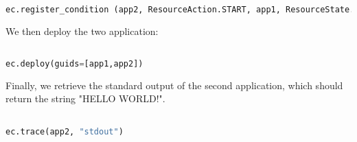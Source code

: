 \begin{lstlisting}[language=Python]

ec.register_condition (app2, ResourceAction.START, app1, ResourceState.STOPPED)

\end{lstlisting}

We then deploy the two application:

\begin{lstlisting}[language=Python]

ec.deploy(guids=[app1,app2])

\end{lstlisting}

Finally, we retrieve the standard output of the second application, 
which should return the string "HELLO WORLD!".

\begin{lstlisting}[language=Python]

ec.trace(app2, "stdout")

\end{lstlisting}

